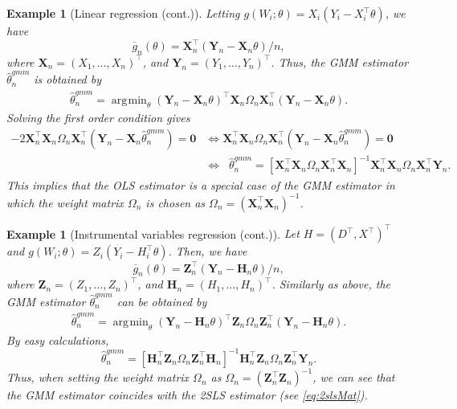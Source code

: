 \documentclass[10.5pt, A4paper, openany, uplatex]{book}
\newcommand{\mbf}{\mathbf}
\renewcommand{\hat}{\widehat}
\renewcommand{\bar}{\overline}
\newtheorem{example}[theorem]{Example}
\numberwithin{equation}{section}
\DeclareMathOperator*{\argmin}{\arg\!\min}
\begin{document}
\begin{example}[Linear regression (cont.)]\upshape
	Letting $g(W_i; \theta) = X_i( Y_i - X_i^\top\theta)$, we have
	\[
	\bar{g}_n(\theta) = \mbf{X}_n^\top (\mbf{Y}_n - \mbf{X}_n \theta)/n,
	\]
	where $\mbf{X}_n = (X_1, \ldots , X_n)^\top$, and $\mbf{Y}_n = (Y_1, \ldots , Y_n)^\top$.
	Thus, the GMM estimator $\hat\theta_n^{gmm}$ is obtained by
	\begin{align*}
		\hat{\theta}_n^{gmm} = \argmin_{\theta} (\mbf{Y}_n - \mbf{X}_n \theta)^\top \mbf{X}_n \Omega_n \mbf{X}_n^\top (\mbf{Y}_n - \mbf{X}_n \theta).
	\end{align*} 
	Solving the first order condition gives
	\begin{align*}
		- 2\mbf{X}_n^\top \mbf{X}_n \Omega_n \mbf{X}_n^\top (\mbf{Y}_n - \mbf{X}_n \hat\theta_n^{gmm}) = \mbf{0} 
		& \iff \mbf{X}_n^\top \mbf{X}_n \Omega_n \mbf{X}_n^\top (\mbf{Y}_n - \mbf{X}_n \hat\theta_n^{gmm}) = \mbf{0} \\
		& \iff \;\; \hat\theta_n^{gmm} = \left[\mbf{X}_n^\top \mbf{X}_n \Omega_n \mbf{X}_n^\top\mbf{X}_n \right]^{-1} \mbf{X}_n^\top \mbf{X}_n \Omega_n \mbf{X}_n^\top\mbf{Y}_n.
	\end{align*}
	This implies that the OLS estimator is a special case of the GMM estimator in which the weight matrix $\Omega_n$ is chosen as $\Omega_n = (\mbf{X}_n^\top \mbf{X}_n)^{-1}$.
\end{example}

\begin{example}[Instrumental variables regression (cont.)]\upshape
	Let $H = (D^\top, X^\top)^\top$ and $g(W_i; \theta) = Z_i (Y_i - H_i^\top\theta)$.
	Then, we have
	\[
	\bar{g}_n(\theta) = \mbf{Z}_n^\top (\mbf{Y}_n - \mbf{H}_n \theta)/n,
	\]
	where $\mbf{Z}_n = (Z_1, \ldots, Z_n)^\top$, and $\mbf{H}_n = (H_1, \ldots , H_n)^\top$.
	Similarly as above, the GMM estimator $\hat\theta_n^{gmm}$ can be obtained by
	\begin{align*}
		\hat{\theta}_n^{gmm} = \argmin_{\theta} (\mbf{Y}_n - \mbf{H}_n \theta)^\top \mbf{Z}_n \Omega_n \mbf{Z}_n^\top (\mbf{Y}_n - \mbf{H}_n \theta).
	\end{align*}
	By easy calculations,
	\[
	\hat \theta_n^{gmm} = \left[\mbf{H}_n^\top \mbf{Z}_n \Omega_n \mbf{Z}_n^\top\mbf{H}_n \right]^{-1} \mbf{H}_n^\top \mbf{Z}_n \Omega_n \mbf{Z}_n^\top\mbf{Y}_n.
	\]
	Thus, when setting the weight matrix $\Omega_n$ as $\Omega_n = (\mbf{Z}_n^\top \mbf{Z}_n)^{-1}$, we can see that  the GMM estimator coincides with the 2SLS estimator (see \eqref{eq:2slsMat}).
\end{example}
\end{document}
